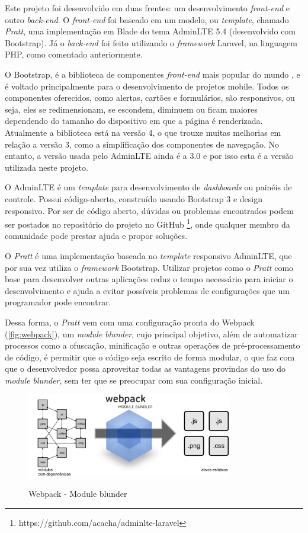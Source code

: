 \newpage
Este projeto foi desenvolvido em duas frentes: um desenvolvimento \textit{front-end} e outro \textit{back-end}. O \textit{front-end} foi baseado em um modelo, ou \textit{template}, chamado \textit{Pratt}, uma implementação em Blade do tema AdminLTE 5.4 (desenvolvido com Bootstrap). Já o \textit{back-end} foi feito utilizando o \textit{framework} Laravel, na linguagem PHP, como comentado anteriormente.

O Bootstrap, é a biblioteca de componentes \textit{front-end} mais popular do mundo \cite{bootstrap}, e é voltado principalmente para o desenvolvimento de projetos mobile. Todos os componentes oferecidos, como alertas, cartões e formulários, são responsivos, ou seja, eles se redimensionam, se escondem, diminuem ou ficam maiores dependendo do tamanho do dispositivo em que a página é renderizada. Atualmente a biblioteca está na versão 4, o que trouxe muitas melhorias em relação a versão 3, como a simplificação dos componentes de navegação. No entanto, a versão usada pelo AdminLTE ainda é a 3.0 e por isso esta é a versão utilizada neste projeto.

O AdminLTE é um \textit{template} para desenvolvimento de \textit{dashboards} ou painéis de controle. Possui código-aberto, construído usando Bootstrap 3 e design responsivo. Por ser de código aberto, dúvidas ou problemas encontrados podem ser postados no repositório do projeto no GitHub
\footnote{https://github.com/acacha/adminlte-laravel}, onde qualquer membro da comunidade pode prestar ajuda e propor soluções.

O \textit{Pratt} é uma implementação baseada no \textit{template} responsivo AdminLTE, que por sua vez utiliza o \textit{framework} Bootstrap. Utilizar projetos como o \textit{Pratt} como base para desenvolver outras aplicações reduz o tempo necessário para iniciar o desenvolvimento e ajuda a evitar possíveis problemas de configurações que um programador pode encontrar. 

Dessa forma, o \textit{Pratt} vem com uma configuração pronta do Webpack (\autoref{fig:webpack}), um \textit{module blunder}, cujo principal objetivo, além de automatizar processos como a ofuscação, minificação e outras operações de pré-processamento de código, é permitir que o código seja escrito de forma modular, o que faz com que o desenvolvedor possa aproveitar todas as vantagens provindas do uso do \textit{module blunder}, sem ter que se preocupar com sua configuração inicial.

\begin{figure}[H]
    \centering
    \caption{Webpack - Module blunder}
    \includegraphics[width=0.8\textwidth]{./dados/figuras/fig17}
    \label{fig:webpack}
\end{figure}

